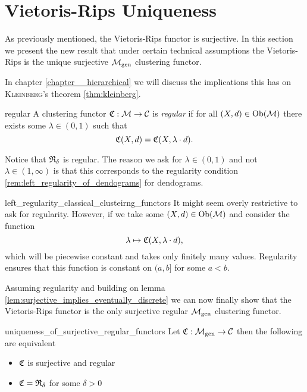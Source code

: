 \section[Vietoris-Rips Uniqueness]{Vietoris-Rips Uniqueness \newresult[]}

As previously mentioned, the Vietoris-Rips functor is surjective.
In this section we present the new result that under certain technical assumptions the Vietoris-Rips is the unique surjective ${\mathcal{M}_\mathrm{gen}}$ clustering functor.

In chapter \ref{chapter__hierarchical} we will discuss the implications this has on \textsc{Kleinberg}'s theorem \ref{thm:kleinberg}.

\begin{definition}{}{regular}
    A clustering functor $\mathfrak{C}: \mathcal{M} \to \mathcal{C}$ is \emph{regular} if for all $(X,d) \in \mathrm {Ob}(\mathcal{M})$ there exists some $\lambda \in (0, 1)$ such that
    $$
    \mathfrak{C}(X,d) = \mathfrak{C}(X, \lambda \cdot d).
    $$
    
\end{definition}

Notice that $\mathfrak{R}_\delta$ is regular. The reason we ask for $\lambda \in (0,1)$ and not $\lambda \in (1, \infty)$ is that this corresponds to the regularity condition \ref{rem:left_regularity_of_dendograms} for dendograms.\par

\begin{myremark}{}{left_regularity_classical_clusteirng_functors}
    \medskip It might seem overly restrictive to ask for regularity.
    However, if we take some $(X, d) \in \mathrm {Ob}(\mathcal{M})$ and consider the function 
    $$
    \lambda \mapsto \mathfrak{C}(X, \lambda \cdot d),
    $$
    which will be piecewise constant and takes only finitely many values.
    Regularity ensures that this function is constant on $(a, b]$ for some $a < b$.
\end{myremark}

Assuming regularity and building on lemma \ref{lem:surjective_implies_eventually_discrete} we can now finally show that the Vietoris-Rips functor is the only surjective regular ${\mathcal{M}_\mathrm{gen}}$ clustering functor.

\begin{theorem}{}{uniqueness_of_surjective_regular_functors}
    Let $\mathfrak{C}: {\mathcal{M}_\mathrm{gen}} \to \mathcal{C}$ then the following are equivalent

    \begin{itemize}
        \item $\mathfrak{C}$ is surjective and regular
        \item $\mathfrak{C} = \mathfrak{R}_{\delta}$ for some $\delta > 0$
    \end{itemize}
\end{theorem}

